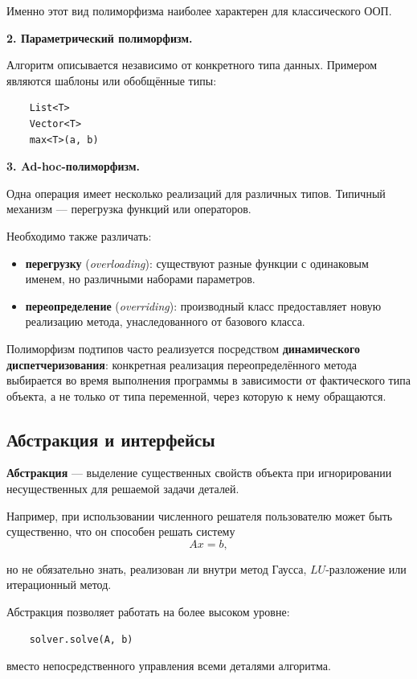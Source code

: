 Именно этот вид полиморфизма наиболее характерен для классического ООП.

\textbf{2. Параметрический полиморфизм.}

Алгоритм описывается независимо от конкретного типа данных. Примером являются шаблоны или обобщённые типы:
\begin{verbatim}
	List<T>
	Vector<T>
	max<T>(a, b)
\end{verbatim}

\textbf{3. Ad-hoc-полиморфизм.}

Одна операция имеет несколько реализаций для различных типов. Типичный механизм --- перегрузка функций или операторов.

Необходимо также различать:
\begin{itemize}
	\item \textbf{перегрузку} (\textit{overloading}): существуют разные функции с одинаковым именем, но различными наборами параметров.
	\item \textbf{переопределение} (\textit{overriding}): производный класс предоставляет новую реализацию метода, унаследованного от базового класса.
\end{itemize}

Полиморфизм подтипов часто реализуется посредством \textbf{динамического диспетчеризования}: конкретная реализация переопределённого метода выбирается во время выполнения программы в зависимости от фактического типа объекта, а не только от типа переменной, через которую к нему обращаются.

\subsection{Абстракция и интерфейсы}

\textbf{Абстракция} --- выделение существенных свойств объекта при игнорировании несущественных для решаемой задачи деталей.

Например, при использовании численного решателя пользователю может быть существенно, что он способен решать систему
\[
Ax=b,
\]

но не обязательно знать, реализован ли внутри метод Гаусса, $LU$-разложение или итерационный метод.

Абстракция позволяет работать на более высоком уровне:
\begin{verbatim}
	solver.solve(A, b)
\end{verbatim}

вместо непосредственного управления всеми деталями алгоритма.

